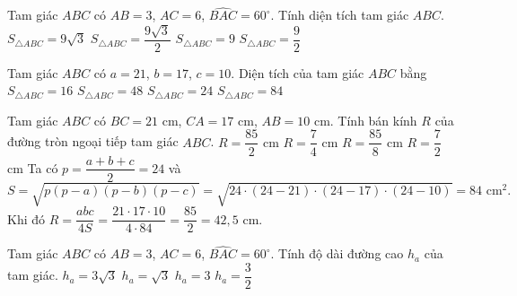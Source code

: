 \begin{ex}%
	Tam giác $ABC$ có $AB=3$, $AC=6$, $\widehat{BAC}=60^{\circ}$. Tính diện tích tam giác $ABC$.
	\choice
	{$S_{\triangle ABC}=9\sqrt{3}$}
	{\True $S_{\triangle ABC}=\dfrac{9\sqrt{3}}
	{2}$}
	{$S_{\triangle ABC}=9$}
	{$S_{\triangle ABC}=\dfrac{9}{2}$}
\end{ex}
\begin{ex}%
	Tam giác $ABC$ có $a=21$, $b=17$, $c=10$. Diện tích của tam giác $ABC$ bằng
	\choice
	{$S_{\triangle ABC}=16$}
	{$S_{\triangle ABC}=48$}
	{$S_{\triangle ABC}=24$}
	{\True $S_{\triangle ABC}=84$}
\end{ex}
\begin{ex}%
	Tam giác $ABC$ có $BC=21$ cm, $CA=17$ cm, $AB=10$ cm. Tính bán kính $R$ của đường tròn ngoại tiếp tam giác $ABC$.
	\choice
	{\True $R=\dfrac{85}
	{2}$ cm}
	{$R=\dfrac{7}
	{4}$ cm}
	{$R=\dfrac{85}{8}$ cm}
	{$R=\dfrac{7}{2}$ cm}
	\loigiai
	{Ta có $p=\dfrac{a+b+c}{2} =24$ và $$S=\sqrt{p(p-a)(p-b)(p-c)}=\sqrt{24\cdot (24-21)\cdot (24-17)\cdot (24-10)} =84\text{ cm}^2.$$
	Khi đó $R=\dfrac{abc}{4S}=\dfrac{21\cdot 17\cdot 10}{4\cdot 84}=\dfrac{85}{2}=42{,}5$ cm.
	}
\end{ex}
\begin{ex}%
	Tam giác $ABC$ có $AB=3$, $AC=6$, $\widehat{BAC}=60^{\circ}$. Tính độ dài đường cao $h_a$ của tam giác.
	\choice
	{$h_a=3\sqrt{3}$}
	{$h_a=\sqrt{3}$}
	{\True $h_a=3$}
	{$h_a=\dfrac{3}{2}$}
\end{ex}
